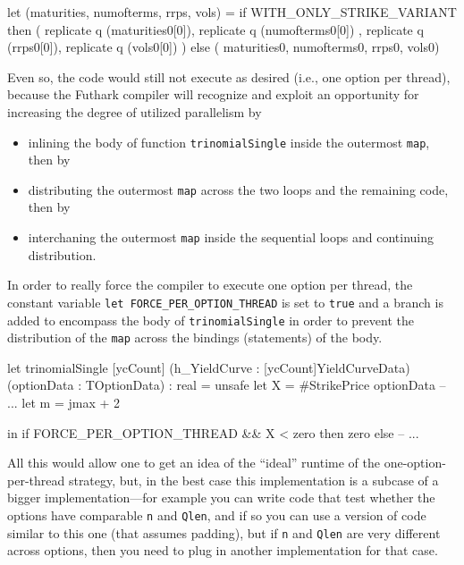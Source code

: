 \documentclass[a4paper,11pt]{article}
\begin{document}
\begin{fancycode}
  let (maturities, numofterms, rrps, vols) =
      if WITH_ONLY_STRIKE_VARIANT
      then ( replicate q (maturities0[0]), replicate q (numofterms0[0])
           , replicate q (rrps0[0]), replicate q (vols0[0])            )
      else ( maturities0, numofterms0, rrps0, vols0)
\end{fancycode}

Even so, the code would still not execute as desired (i.e., one option 
per thread), because the Futhark compiler will recognize and exploit
an opportunity for increasing the degree of utilized parallelism by
\begin{itemize}
    \item inlining the body of function {\tt trinomialSingle} inside
            the outermost {\tt map}, then by
    \item distributing the outermost {\tt map} across the two loops
            and the remaining code, then by
    \item interchaning the outermost {\tt map} inside the sequential
            loops and continuing distribution.
\end{itemize} 

In order to really force the compiler to execute one option per 
thread, the constant variable {\tt let FORCE\_PER\_OPTION\_THREAD} 
is set to {\tt true} and a branch is added to encompass the body 
of {\tt trinomialSingle} in order to prevent the distribution of
the {\tt map} across the bindings (statements) of the body.

\begin{fancycode}
let trinomialSingle [ycCount]
                    (h_YieldCurve : [ycCount]YieldCurveData)
                    (optionData : TOptionData) : real = unsafe
  let X  = #StrikePrice   optionData
  -- ...
  let m  = jmax + 2

  in if FORCE_PER_OPTION_THREAD && X < zero 
     then zero else
  -- ...
\end{fancycode}

All this would allow one to get an idea of the ``ideal'' runtime
of the one-option-per-thread strategy, but, in the best case this
implementation is a subcase of a bigger implementation---for example
you can write code that test whether the options have comparable 
{\tt n} and {\tt Qlen}, and if so you can use a version of code 
similar to this one (that assumes padding), but if {\tt n} and 
{\tt Qlen} are very different across options, then you need to 
plug in another implementation for that case.
\end{document}
